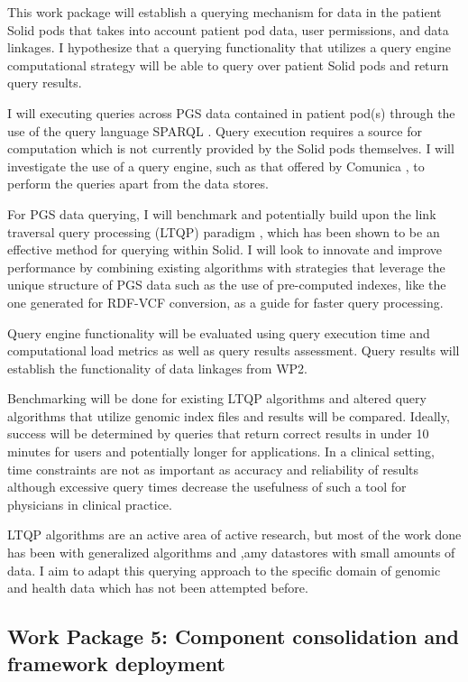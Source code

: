 \documentclass[a4paper,11pt]{article}
\begin{document}
This work package will establish a querying mechanism for data in the patient Solid pods that takes into account patient pod data, user permissions, and data linkages. 
I hypothesize that a querying functionality that utilizes a query engine computational strategy will be able to query over patient Solid pods and return query results.

I will executing queries across PGS data contained in patient pod(s) through the use of the query language SPARQL \cite{noauthor_sparql_nodate}.
Query execution requires a source for computation which is not currently provided by the Solid pods themselves.
I will investigate the use of a query engine, such as that offered by Comunica \cite{comunica}, to perform the queries apart from the data stores.

For PGS data querying, I will benchmark and potentially build upon the link traversal query processing (LTQP) paradigm \cite{taelman_evaluation_2023}, which has been shown to be an effective method for querying within Solid.  
I will look to innovate and improve performance by combining existing algorithms with strategies that leverage the unique structure of PGS data such as the use of pre-computed indexes, like the one generated for RDF-VCF conversion, as a guide for faster query processing.

Query engine functionality will be evaluated using query execution time and computational load metrics as well as query results assessment. 
Query results will establish the functionality of data linkages from WP2.

Benchmarking will be done for existing LTQP algorithms and altered query algorithms that utilize genomic index files and results will be compared.
Ideally, success will be determined by queries that return correct results in under 10 minutes for users and potentially longer for applications.
In a clinical setting, time constraints are not as important as accuracy and reliability of results although excessive query times decrease the usefulness of such a tool for physicians in clinical practice.

LTQP algorithms are an active area of active research, but most of the work done has been with generalized algorithms and ,amy datastores with small amounts of data.
I aim to adapt this querying approach to the specific domain of genomic and health data which has not been attempted before. 


\subsection{Work Package 5: Component consolidation and framework deployment}
\end{document}
